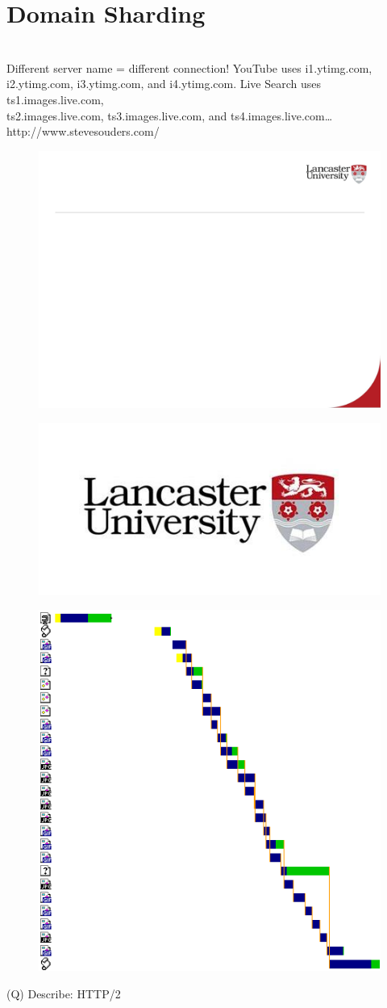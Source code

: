 \documentclass[12pt]{article}
\begin{document}
\section{Domain Sharding}
\\
Different server name = different connection! YouTube uses i1.ytimg.com, \\
i2.ytimg.com, i3.ytimg.com, and i4.ytimg.com. Live Search uses ts1.images.live.com, \\
ts2.images.live.com, ts3.images.live.com, and ts4.images.live.com…\\
http://www.stevesouders.com/\\
\begin{figure}[H]
\includegraphics[width=0.5\linewidth]{page80-image-1.png}
\end{figure}
\begin{figure}[H]
\includegraphics[width=0.5\linewidth]{page80-image-2.png}
\end{figure}
\begin{figure}[H]
\includegraphics[width=0.5\linewidth]{page80-image-3.png}
\end{figure}
\clearpage
(Q)
Describe: HTTP/2
\clearpage
\end{document}
